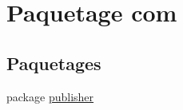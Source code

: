 \hypertarget{namespacecom}{\section{Paquetage com}
\label{namespacecom}
}
\subsection*{Paquetages}
\begin{DoxyCompactItemize}
\item 
package \hyperlink{namespacecom_1_1publisher}{publisher}
\end{DoxyCompactItemize}
